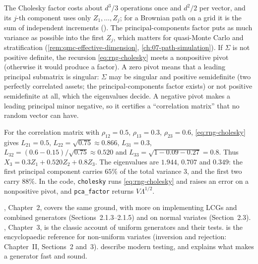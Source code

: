 The Cholesky factor costs about $d^3/3$ operations once and $d^2/2$ per vector, and its
$j$-th component uses only $Z_1,\dots,Z_j$; for a Brownian path on a grid it is the sum of
independent increments (). The principal-components factor puts as
much variance as possible into the first $Z_j$, which matters for quasi-Monte Carlo and
stratification (\cref{rem:qmc-effective-dimension}, \cref{ch:07-path-simulation}). If
$\Sigma$ is not positive definite, the recursion \eqref{eq:rng-cholesky} meets a nonpositive
pivot (otherwise it would produce a factor). A zero pivot means that a leading principal
submatrix is singular: $\Sigma$ may be singular and positive semidefinite (two perfectly
correlated assets; the principal-components factor exists) or not positive semidefinite at all,
which the eigenvalues decide. A negative pivot makes a leading principal minor negative, so it
certifies a ``correlation matrix'' that no random vector can have.

\begin{example}\label{exm:rng-three-assets}
For the correlation matrix with $\rho_{12}=0.5$, $\rho_{13}=0.3$, $\rho_{23}=0.6$,
\eqref{eq:rng-cholesky} gives $L_{21}=0.5$, $L_{22}=\sqrt{0.75}\approx0.866$, $L_{31}=0.3$,
$L_{32}=(0.6-0.15)/\sqrt{0.75}\approx0.520$ and $L_{33}=\sqrt{1-0.09-0.27}=0.8$. Thus
$X_3=0.3Z_1+0.520Z_2+0.8Z_3$. The eigenvalues are $1.944$, $0.707$ and $0.349$: the first
principal component carries $65\%$ of the total variance $3$, and the first two carry $88\%$.
In the code, \texttt{cholesky} runs \eqref{eq:rng-cholesky} and raises an error on a
nonpositive pivot, and \texttt{pca\_factor} returns $V\Lambda^{1/2}$.
\end{example}


\furtherreading
\textcite{glasserman-mc}, Chapter~2, covers the same ground, with more on implementing
LCGs and combined generators (Sections~2.1.3--2.1.5) and on normal variates (Section~2.3).
\textcite{knuth-taocp2}, Chapter~3, is the classic account of uniform generators and their
tests. \textcite{devroye} is the encyclopaedic reference for non-uniform variates (inversion
and rejection: Chapter~II, Sections~2 and~3). \textcite{lecuyer-simard} describe modern
testing, and \textcite{oneill-pcg} explains what makes a generator fast and sound.
